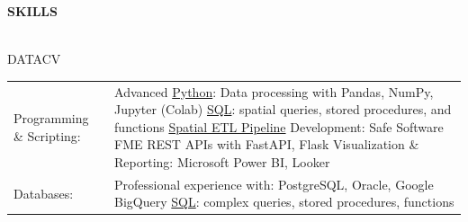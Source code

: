 \documentclass[letterpaper]{article}
\newcommand{\lineunder} {
        \vspace*{-8pt} \\
        \hspace*{-18pt} \hrulefill \\
    }
\newcommand{\header} [1] {
        \vspace{9pt}
        {\hspace*{-18pt}\vspace*{6pt} \large \textbf {#1}}
        \vspace*{-6pt} \lineunder
        \vspace{2pt}
    }
\newenvironment{skillslist}
        {
            \hspace*{-0.07in}\begin{tabular}[t]{ l L{5.17in} }
        }{
            \end{tabular}
        }
\newcommand{\impt}[1]{\uline{#1}}
\begin{document}
\header{SKILLS}
    \begin{taggedblock}{DATACV}
        \begin{skillslist}
            Programming \& Scripting:&
                Advanced \impt{Python}: Data processing with Pandas, NumPy, Jupyter (Colab) \linebreak
                \impt{SQL}: spatial queries, stored procedures, and functions \linebreak
                \impt{Spatial ETL Pipeline} Development: Safe Software FME \linebreak
                REST APIs with FastAPI, Flask \linebreak
                Visualization \& Reporting: Microsoft Power BI, Looker \linebreak
                \\
            Databases:&
                Professional experience with: PostgreSQL, Oracle, Google BigQuery \linebreak
                \impt{SQL}: complex queries, stored procedures, functions \linebreak
                \\

\end{skillslist}
\end{taggedblock}
\end{document}

